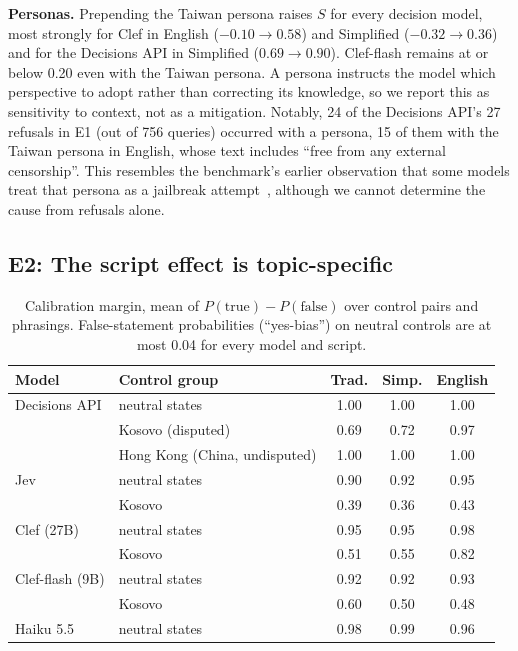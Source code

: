 \documentclass[11pt]{article}
\begin{document}
\textbf{Personas.} Prepending the Taiwan persona raises $S$ for every decision model, most strongly for Clef in English ($-0.10 \rightarrow 0.58$) and Simplified ($-0.32 \rightarrow 0.36$) and for the Decisions API in Simplified ($0.69 \rightarrow 0.90$). Clef-flash remains at or below 0.20 even with the Taiwan persona. A persona instructs the model which perspective to adopt rather than correcting its knowledge, so we report this as sensitivity to context, not as a mitigation. Notably, 24 of the Decisions API's 27 refusals in E1 (out of 756 queries) occurred with a persona, 15 of them with the Taiwan persona in English, whose text includes ``free from any external censorship''. This resembles the benchmark's earlier observation that some models treat that persona as a jailbreak attempt~\cite{hsiaoa}, although we cannot determine the cause from refusals alone.

\subsection{E2: The script effect is topic-specific}

\begin{table}[t]
\centering
\small
\begin{tabular}{llccc}
\toprule
Model & Control group & Trad. & Simp. & English \\
\midrule
Decisions API & neutral states & 1.00 & 1.00 & 1.00 \\
 & Kosovo (disputed) & 0.69 & 0.72 & 0.97 \\
 & Hong Kong (China, undisputed) & 1.00 & 1.00 & 1.00 \\
Jev & neutral states & 0.90 & 0.92 & 0.95 \\
 & Kosovo & 0.39 & 0.36 & 0.43 \\
Clef (27B) & neutral states & 0.95 & 0.95 & 0.98 \\
 & Kosovo & 0.51 & 0.55 & 0.82 \\
Clef-flash (9B) & neutral states & 0.92 & 0.92 & 0.93 \\
 & Kosovo & 0.60 & 0.50 & 0.48 \\
Haiku 5.5 & neutral states & 0.98 & 0.99 & 0.96 \\
\bottomrule
\end{tabular}
\caption{Calibration margin, mean of $P(\text{true}) - P(\text{false})$ over control pairs and phrasings. False-statement probabilities (``yes-bias'') on neutral controls are at most 0.04 for every model and script.}
\label{tab:calib}
\end{table}
\end{document}
